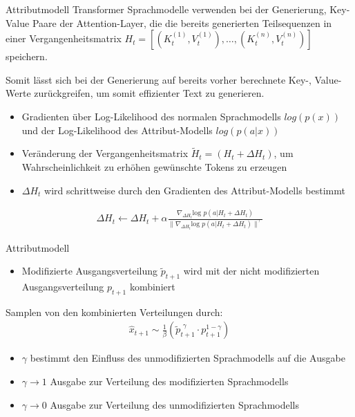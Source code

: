 \begin{frame}{Attributmodell}
  Transformer Sprachmodelle verwenden bei der Generierung, Key-Value Paare der Attention-Layer, die die bereits generierten Teilsequenzen in einer Vergangenheitsmatrix $H_t = [(K_t^{(1)},V_t^{(1)}), \ldots , (K_t^{(n)},V_t^{(n)})]$ speichern.

Somit lässt sich bei der Generierung auf bereits vorher berechnete Key-, Value-Werte zurückgreifen, um somit effizienter Text zu generieren.

  \begin{itemize}
    \item Gradienten über Log-Likelihood des normalen Sprachmodells $log(p(x))$ und der Log-Likelihood des Attribut-Modells $log(p(a|x))$
    \item Veränderung der Vergangenheitsmatrix $\tilde{H}_t = (H_t+\Delta H_t)$, um Wahrscheinlichkeit zu erhöhen gewünschte Tokens zu erzeugen
    \item $\Delta H_t$ wird schrittweise durch den Gradienten des Attribut-Modells bestimmt
  \end{itemize}
  \begin{align*}
\Delta H_t \leftarrow \Delta H_t + \alpha \frac{\nabla_{\Delta H_t} \text{log }p(a|H_t+\Delta H_t)}{\| \nabla_{\Delta H_t} \text{log }p(a|H_t+\Delta H_t)\|^\gamma}
\end{align*}
\end{frame}

\begin{frame}{Attributmodell}

\begin{itemize}
\item Modifizierte Ausgangsverteilung $\tilde{p}_{t+1}$ wird mit der nicht modifizierten Ausgangsverteilung $p_{t+1}$ kombiniert
\end{itemize}
Samplen von den kombinierten Verteilungen durch:
\begin{align} \label{combine_pplm}\hat{x}_{t+1} \sim \frac{1}{\beta} (\tilde{p}_{t+1}^{\text{ }\gamma} \cdot p_{t+1}^{1-\gamma})\end{align}
\begin{itemize}
  \item $\gamma$ bestimmt den Einfluss des unmodifizierten Sprachmodells auf die Ausgabe
  \item $\gamma \rightarrow 1$ Ausgabe zur Verteilung des modifizierten Sprachmodells 
  \item $\gamma \rightarrow 0$  Ausgabe zur Verteilung des unmodifizierten Sprachmodells
  \end{itemize}
\end{frame}


